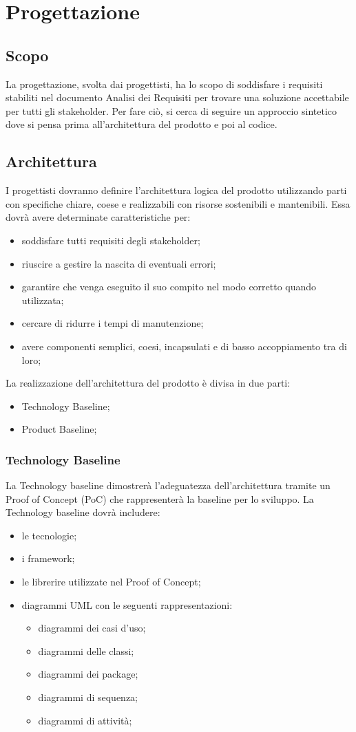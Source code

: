 \documentclass{article}
\begin{document}
	\section{Progettazione}
	\subsection{Scopo}
	La progettazione, svolta dai progettisti, ha lo scopo di soddisfare i requisiti stabiliti nel documento Analisi dei Requisiti per trovare una soluzione accettabile per tutti gli stakeholder.
	Per fare ciò, si cerca di seguire un approccio sintetico dove si pensa prima all’architettura del prodotto e poi al codice.
	\subsection{Architettura}	I progettisti dovranno definire l’architettura logica del prodotto utilizzando parti con specifiche chiare, coese e realizzabili con risorse sostenibili e mantenibili. Essa dovrà avere determinate caratteristiche per:
	\begin{itemize}
		\item	soddisfare tutti requisiti degli stakeholder;
		\item	riuscire a gestire la nascita di eventuali errori;
		\item	garantire che venga eseguito il suo compito nel modo corretto quando utilizzata;
		\item	cercare di ridurre i tempi di manutenzione;
		\item   avere componenti semplici, coesi, incapsulati e di basso accoppiamento tra di loro;
	\end{itemize}
	La realizzazione dell’architettura del prodotto è divisa in due parti:
	\begin{itemize}
		\item Technology Baseline;
		\item Product Baseline;
	\end{itemize}
	\subsubsection{Technology Baseline}
	La Technology baseline dimostrerà l’adeguatezza dell’architettura tramite un Proof of Concept (PoC) che rappresenterà la baseline per lo sviluppo. 
	La Technology baseline dovrà includere:
	\begin{itemize}
		\item le tecnologie;
		\item i framework;
		\item le librerire utilizzate nel Proof of Concept;
		\item diagrammi UML con le seguenti rappresentazioni:
		\begin{itemize}
			\item 	diagrammi dei casi d’uso; 
			\item 	diagrammi delle classi; 
			\item 	diagrammi dei package;
			\item 	diagrammi di sequenza; 
			\item 	diagrammi di attività;
		\end{itemize}
	\end{itemize}
\end{document}
